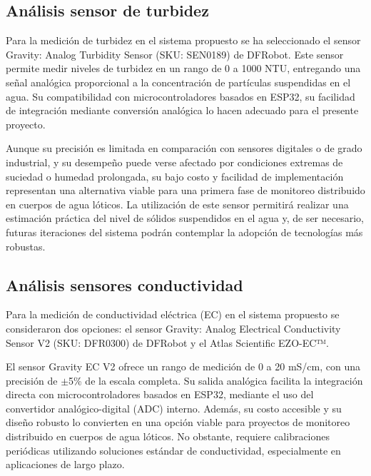 \subsection{Análisis sensor de turbidez}


Para la medición de turbidez en el sistema propuesto se ha seleccionado el sensor Gravity: Analog Turbidity Sensor (SKU: SEN0189) de DFRobot. Este sensor permite medir niveles de turbidez en un rango de 0 a 1000 NTU, entregando una señal analógica proporcional a la concentración de partículas suspendidas en el agua. Su compatibilidad con microcontroladores basados en ESP32, su facilidad de integración mediante conversión analógica lo hacen adecuado para el presente proyecto.

Aunque su precisión es limitada en comparación con sensores digitales o de grado industrial, y su desempeño puede verse afectado por condiciones extremas de suciedad o humedad prolongada, su bajo costo y facilidad de implementación representan una alternativa viable para una primera fase de monitoreo distribuido en cuerpos de agua lóticos. La utilización de este sensor permitirá realizar una estimación práctica del nivel de sólidos suspendidos en el agua y, de ser necesario, futuras iteraciones del sistema podrán contemplar la adopción de tecnologías más robustas.


\subsection{Análisis sensores conductividad}


Para la medición de conductividad eléctrica (EC) en el sistema propuesto se consideraron dos opciones: el sensor Gravity: Analog Electrical Conductivity Sensor V2 (SKU: DFR0300) de DFRobot y el Atlas Scientific EZO-EC™.

El sensor Gravity EC V2 ofrece un rango de medición de 0 a 20 mS/cm, con una precisión de $\pm$5\% de la escala completa. Su salida analógica facilita la integración directa con microcontroladores basados en ESP32, mediante el uso del convertidor analógico-digital (ADC) interno. Además, su costo accesible y su diseño robusto lo convierten en una opción viable para proyectos de monitoreo distribuido en cuerpos de agua lóticos. No obstante, requiere calibraciones periódicas utilizando soluciones estándar de conductividad, especialmente en aplicaciones de largo plazo.

